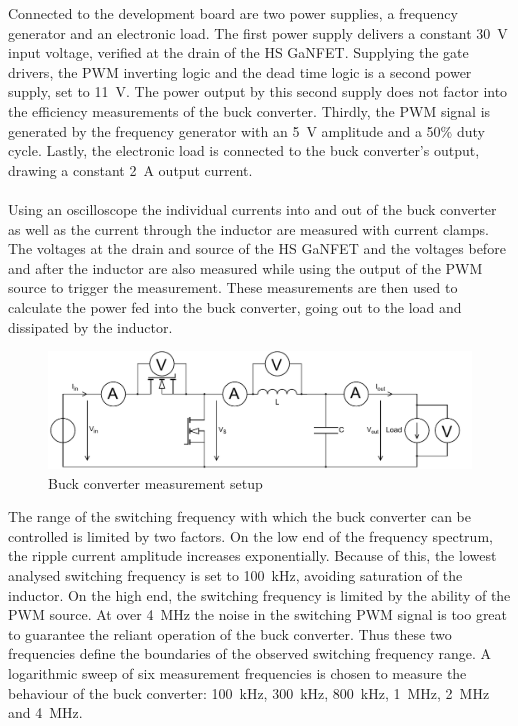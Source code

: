 Connected to the development board are two power supplies, a frequency generator and an electronic load. The first power supply delivers a constant \SI{30}{\V} input voltage, verified at the drain of the \ac{HS} \ac{GaNFET}. Supplying the gate drivers, the \ac{PWM} inverting logic and the dead time logic is a second power supply, set to \SI{11}{\V}. The power output by this second supply does not factor into the efficiency measurements of the buck converter. Thirdly, the \ac{PWM} signal is generated by the frequency generator with an \SI{5}{\V} amplitude and a 50\% duty cycle. Lastly, the electronic load is connected to the buck converter's output, drawing a constant \SI{2}{\A} output current.\\\\
Using an oscilloscope the individual currents into and out of the buck converter as well as the current through the inductor are measured with current clamps. The voltages at the drain and source of the \ac{HS} \ac{GaNFET} and the voltages before and after the inductor are also measured while using the output of the \ac{PWM} source to trigger the measurement. These measurements are then used to calculate the power fed into the buck converter, going out to the load and dissipated by the inductor. 
\begin{figure}
    \centering
    \includegraphics[width=1\linewidth]{Bilder/Kapitel4/BC_Measurement_Setup.pdf}
    \caption{Buck converter measurement setup}
    \label{fig:buck_converter_measurement_setup}
\end{figure}
The range of the switching frequency with which the buck converter can be controlled is limited by two factors. On the low end of the frequency spectrum, the ripple current amplitude increases exponentially. Because of this, the lowest analysed switching frequency is set to \SI{100}{\kilo\Hz}, avoiding saturation of the inductor. On the high end, the switching frequency is limited by the ability of the \ac{PWM} source. At over \SI{4}{\mega\Hz} the noise in the switching \ac{PWM} signal is too great to guarantee the reliant operation of the buck converter. Thus these two frequencies define the boundaries of the observed switching frequency range. A logarithmic sweep of six measurement frequencies is chosen to measure the behaviour of the buck converter: \SI{100}{\kilo\Hz}, \SI{300}{\kilo\Hz}, \SI{800}{\kilo\Hz}, \SI{1}{\mega\Hz}, \SI{2}{\mega\Hz} and \SI{4}{\mega\Hz}.
